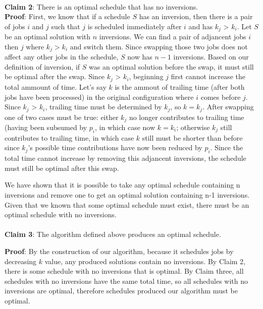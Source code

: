 \documentclass[a4paper]{article}
\begin{document}
\begin{itemize}
\\
\textbf{Claim 2}: There is an optimal schedule that has no inversions. \\
\textbf{Proof}: First, we know that if a schedule $S$ has an inversion, then there is a pair of jobs $i$ and $j$ such that $j$ is scheduled immediately after $i$ and has $k_j$ >  $k_i$. Let $S$ be an optimal solution with $n$ inversions. We can find a pair of adjancent jobs $i$ then $j$ where $k_j > k_i$ and switch them. Since swapping those two jobs does not affect any other jobs in the schedule, $S$ now has $n-1$ inversions. Based on our definition of inversion, if $S$ was an optimal solution before the swap, it must still be optimal after the swap. Since $k_j$ > $k_i$, beginning $j$ first cannot increase the total ammount of time. Let's say $k$ is the ammout of trailing time (after both jobs have been processed) in the original configuration where $i$ comes before $j$. Since $k_j$ > $k_i$, trailing time must be determined by $k_j$, so $k = k_j$. After swapping one of two cases must be true: either $k_j$ no longer contributes to trailing time (having been subsumed by $p_i$, in which case now $k = k_i$; otherwise $k_j$ still contributes to trailing time, in which case $k$ still must be shorter than before since $k_j$'s possible time contributions have now been reduced by $p_i$. Since the total time cannot increase by removing this adjancent inversions, the schedule must still be optimal after this swap.

We have shown that it is possible to take any optimal schedule containing n inversions and remove one to get an optimal solution containing n-1 inversions. Given that we known that some optimal schedule must exist, there must be an optimal schedule with no inversions. \\
\\
\textbf{Claim 3}: The algorithm defined above produces an optimal schedule.

\textbf{Proof}: By the construction of our algorithm, because it schedules jobs by decreasing $k$ value, any produced solutions contain no inversions. By Claim 2, there is some schedule with no inversions that is optimal. By Claim three, all schedules with no inversions have the same total time, so all schedules with no inversions are optimal, therefore schedules produced our algorithm must be optimal. \\


\end{itemize}
\end{document}
